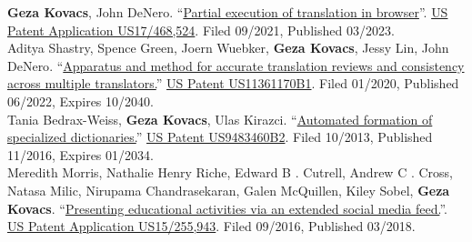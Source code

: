 
{\small \textbf{Geza Kovacs}, John DeNero}. ``\href{https://patents.google.com/patent/US20230070302A1}{Partial execution of translation in browser}''. \hypersetup{urlcolor=black}\href{https://patents.google.com/patent/US20230070302A1}{US Patent Application US17/468,524}. Filed 09/2021, Published 03/2023.\\

{\small Aditya Shastry, Spence Green, Joern Wuebker,} \textbf{Geza Kovacs}, {\small Jessy Lin, John DeNero}. ``\href{https://patents.google.com/patent/US11361170B1}{Apparatus and method for accurate translation reviews and consistency across multiple translators.}'' \hypersetup{urlcolor=black}\href{https://patents.google.com/patent/US11361170B1}{US Patent US11361170B1}\hypersetup{urlcolor=linkcol}. Filed 01/2020, Published 06/2022, Expires 10/2040.\\

{\small Tania Bedrax-Weiss,} \textbf{Geza Kovacs}, {\small Ulas Kirazci.} ``\href{https://patents.google.com/patent/US9483460B2}{Automated formation of specialized dictionaries.}'' \hypersetup{urlcolor=black}\href{https://patents.google.com/patent/US9483460B2}{US Patent US9483460B2}\hypersetup{urlcolor=linkcol}. Filed 10/2013, Published 11/2016, Expires 01/2034.\\

{\small Meredith Morris, Nathalie Henry Riche, Edward B . Cutrell, Andrew C . Cross, Natasa Milic, Nirupama Chandrasekaran, Galen McQuillen, Kiley Sobel,} \textbf{Geza Kovacs}. ``\href{https://patents.google.com/patent/US20180068578A1}{Presenting educational activities via an extended social media feed.}''. \hypersetup{urlcolor=black}\href{https://patents.google.com/patent/US20180068578A1}{US Patent Application US15/255,943}.  Filed 09/2016, Published 03/2018.\\ %
